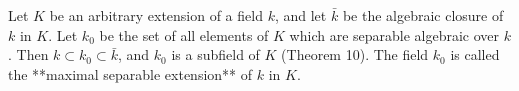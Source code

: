 Let $K$ be an arbitrary extension of a field $k$, and let $\bar{k}$ be the algebraic closure of $k$ in $K$. Let $k_0$ be the set of all elements of $K$ which are separable algebraic over $k$. Then $k \subset k_0 \subset \bar{k}$, and $k_0$ is a subfield of $K$ (Theorem 10). The field $k_0$ is called the **maximal separable extension** of $k$ in $K$.
